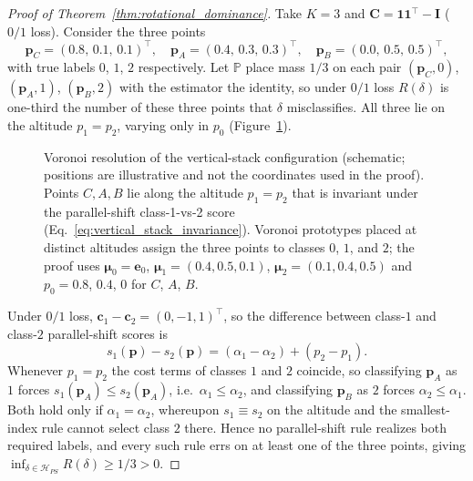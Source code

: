 \begin{proof}[Proof of Theorem~\ref{thm:rotational_dominance}]
    Take $K = 3$ and $\mathbf{C} = \mathbf{1}\mathbf{1}^\top - \mathbf{I}$ ($0/1$ loss). Consider the three points
    \[
        \mathbf{p}_C = (0.8,\, 0.1,\, 0.1)^\top,\quad
        \mathbf{p}_A = (0.4,\, 0.3,\, 0.3)^\top,\quad
        \mathbf{p}_B = (0.0,\, 0.5,\, 0.5)^\top,
    \]
    with true labels $0$, $1$, $2$ respectively. Let $\mathbb{P}$ place mass $1/3$ on each pair $(\mathbf{p}_C, 0)$, $(\mathbf{p}_A, 1)$, $(\mathbf{p}_B, 2)$ with the estimator the identity, so under $0/1$ loss $R(\delta)$ is one-third the number of these three points that $\delta$ misclassifies. All three lie on the altitude $p_1 = p_2$, varying only in $p_0$ (Figure~\ref{fig:voronoi_proof}).

    \begin{figure}[H]
        \centering
        
        \caption{Voronoi resolution of the vertical-stack configuration (schematic; positions are illustrative and not the coordinates used in the proof). Points $C, A, B$ lie along the altitude $p_1 = p_2$ that is invariant under the parallel-shift class-1-vs-2 score (Eq.~\ref{eq:vertical_stack_invariance}). Voronoi prototypes placed at distinct altitudes assign the three points to classes $0$, $1$, and $2$; the proof uses $\boldsymbol{\mu}_0 = \mathbf{e}_0$, $\boldsymbol{\mu}_1 = (0.4, 0.5, 0.1)$, $\boldsymbol{\mu}_2 = (0.1, 0.4, 0.5)$ and $p_0 = 0.8$, $0.4$, $0$ for $C$, $A$, $B$.}\label{fig:voronoi_proof}
    \end{figure}

    Under $0/1$ loss, $\mathbf{c}_1 - \mathbf{c}_2 = (0, -1, 1)^\top$, so the difference between class-$1$ and class-$2$ parallel-shift scores is
    \begin{equation}\label{eq:vertical_stack_invariance}
        s_1(\mathbf{p}) - s_2(\mathbf{p}) = (\alpha_1 - \alpha_2) + (p_2 - p_1).
    \end{equation}
    Whenever $p_1 = p_2$ the cost terms of classes $1$ and $2$ coincide, so classifying $\mathbf{p}_A$ as $1$ forces $s_1(\mathbf{p}_A) \le s_2(\mathbf{p}_A)$, i.e.\ $\alpha_1 \le \alpha_2$, and classifying $\mathbf{p}_B$ as $2$ forces $\alpha_2 \le \alpha_1$. Both hold only if $\alpha_1 = \alpha_2$, whereupon $s_1 \equiv s_2$ on the altitude and the smallest-index rule cannot select class $2$ there. Hence no parallel-shift rule realizes both required labels, and every such rule errs on at least one of the three points, giving $\inf_{\delta \in \mathcal{H}_{PS}} R(\delta) \ge 1/3 > 0$.


\end{proof}
